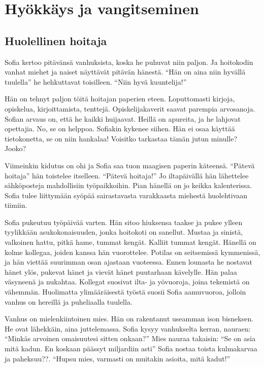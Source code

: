 \chapter{Hyökkäys ja vangitseminen}\label{attack-and-capture}

\section{Huolellinen hoitaja}

\begin{tarina}%
Sofia kertoo pitävänsä vanhuksista, koska he puhuvat niin paljon. Ja hoitokodin vanhat miehet ja naiset näyttävät pitävän hänestä. ``Hän on aina niin hyvällä tuulella\vmq{,}'' he hehkuttavat toisilleen. ``Niin hyvä kuuntelija!''

Hän on tehnyt paljon töitä hoitajan paperien eteen. Loputtomasti kirjoja, opiskelua, kirjoittamista, tenttejä. Opiskelijakaverit saavat parempia arvosanoja. Sofian arvaus on, että he kaikki huijaavat. Heillä on apureita, ja he lahjovat opettajia. No, se on helppoa. Sofiakin kykenee siihen. Hän ei osaa käyttää tietokonetta, se on niin hankalaa! Voisitko tarkastaa tämän jutun minulle? Jooko?

Viimeinkin kidutus on ohi ja Sofia saa tuon maagisen paperin käteensä. ``Pätevä hoitaja\vmq{,}'' hän toistelee itselleen. ``Pätevä hoitaja!'' Jo iltapäivällä hän lähettelee sähköposteja mahdollisiin työpaikkoihin. Pian hänellä on jo keikka kalenterissa. Sofia tulee liittymään syöpää sairastavasta varakkaasta miehestä huolehtivaan tiimiin.

Sofia pukeutuu työpäivää varten. Hän sitoo hiuksensa taakse ja pukee ylleen tyylikkään asukokonaisuuden, jonka hoitokoti on sanellut. Mustaa ja sinistä, valkoinen hattu, pitkä hame, tummat kengät. Kalliit tummat kengät. Hänellä on kolme kollegaa, joiden kanssa hän vuorottelee. Potilas on seitsemissä kymmenissä, ja hän viettää suurimman osan ajastaan vuoteessa. Ennen lounasta he nostavat hänet ylös, pukevat hänet ja vievät hänet puutarhaan kävelylle. Hän palaa väsyneenä ja nukahtaa. Kollegat suosivat ilta- ja yövuoroja, joina tekemistä on vähemmän. Huolimatta ylimääräisestä työstä suosii Sofia aamuvuoroa, jolloin vanhus on hereillä ja puheliaalla tuulella.

Vanhus on mielenkiintoinen mies. Hän on rakentanut useamman ison bisneksen. He ovat lähekkäin, aina juttelemassa. Sofia kysyy vanhukselta kerran, nauraen: ``Minkäs arvoinen omaisuutesi sitten onkaan?'' Mies nauraa takaisin: ``Se on asia mitä kadun. En koskaan päässyt miljardiin asti'' Sofia nostaa toista kulmakarvaa ja paheksuu??. ``Hupsu mies, varmasti on muitakin asioita, mitä kadut!''


\end{tarina}
